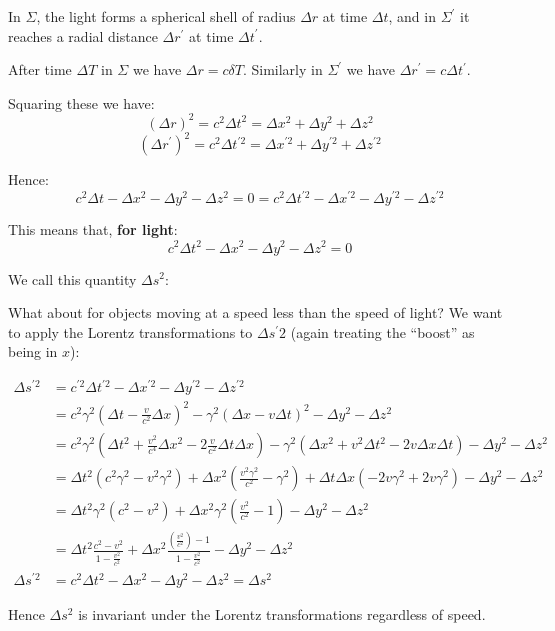 In $\Sigma$, the light forms a spherical shell of radius $\Delta r$ at time $\Delta t$, and in $\Sigma^\prime$ it reaches a radial distance $\Delta r^\prime$ at time $\Delta t^\prime$. 

After time $\Delta T$ in $\Sigma$ we have $\Delta r = c \delta T$. Similarly in $\Sigma^\prime$ we have $\Delta r^\prime = c \Delta t^\prime$.

Squaring these we have:
\[
    \left(\Delta r\right)^2 = c^2 \Delta t^2 = \Delta x^2 + \Delta y^2 + \Delta z^2
\]
\[
    \left(\Delta r^\prime\right)^2 = c^2 \Delta t^{\prime 2} = \Delta x^{\prime 2} + \Delta y^{\prime 2} + \Delta z^{\prime 2}
\]

Hence:
\[
    c^2 \Delta t - \Delta x^2 - \Delta y^2 - \Delta z^2 = 0 = c^2 \Delta t^{\prime 2} - \Delta x^{\prime 2} - \Delta y^{\prime 2} - \Delta z^{\prime 2}
\]

This means that, \textbf{for light}:
\[
    c^2 \Delta t^2 - \Delta x^2 - \Delta y^2 - \Delta z^2 = 0 
\]

We call this quantity $\Delta s^2$:

What about for objects moving at a speed less than the speed of light? We want to apply the Lorentz transformations to $\Delta s{^\prime 2}$ (again treating the ``boost'' as being in $x$):

\begin{align*}
    \Delta s^{\prime 2} &= c^{\prime 2} \Delta t^{\prime 2} - \Delta x^{\prime 2} - \Delta y^{\prime 2} - \Delta z^{\prime 2} \\
    &= c^2 \gamma^2 \left(\Delta t - \frac{v}{c^2} \Delta x\right)^2 - \gamma^2 \left(\Delta x - v \Delta t\right)^2 - \Delta y^2 - \Delta z^2\\
    &= c^2 \gamma^2 \left(\Delta t^2 + \frac{v^2}{c^4} \Delta x^2 - 2 \frac{v}{c^2} \Delta t \Delta x\right) - \gamma^2 \left(\Delta x^2 + v^2 \Delta t^2 - 2v \Delta x \Delta t\right) - \Delta y^2 - \Delta z^2 \\
    &= \Delta t^2 \left(c^2 \gamma^2 - v^2 \gamma^2\right) + \Delta x^2 \left(\frac{v^2 \gamma^2}{c^2}- \gamma^2\right) + \Delta t \Delta x \left(-2v \gamma^2 + 2v \gamma^2\right) - \Delta y^2 - \Delta z^2\\
    &= \Delta t^2 \gamma^2 \left(c^2 - v^2\right) + \Delta x^2 \gamma^2 \left(\frac{v^2}{c^2} - 1\right) - \Delta y^2 - \Delta z^2 \\
    &= \Delta t^2 \frac{c^2 - v^2}{1 - \frac{v^2}{c^2}} + \Delta x^2 \frac{(\frac{v^2}{c^2}) - 1}{1 - \frac{v^2}{c^2}} - \Delta y^2 - \Delta z^2 \\
    \Delta s^{\prime 2} &= \boxed{c^2 \Delta t^2 - \Delta x^2 - \Delta y^2 - \Delta z^2 = \Delta s^2}
\end{align*}


Hence $\Delta s^2$ is invariant under the Lorentz transformations regardless of speed.















